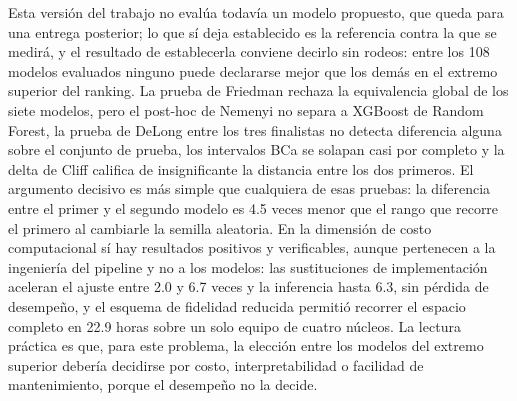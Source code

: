 \documentclass[pdflatex,sn-mathphys-num]{sn-jnl}
\begin{document}
Esta versión del trabajo no evalúa todavía un modelo propuesto, que queda para una entrega posterior; lo que sí deja establecido es la referencia contra la que se medirá, y el resultado de establecerla conviene decirlo sin rodeos: entre los 108 modelos evaluados ninguno puede declararse mejor que los demás en el extremo superior del ranking. La prueba de Friedman rechaza la equivalencia global de los siete modelos, pero el post-hoc de Nemenyi no separa a XGBoost de Random Forest, la prueba de DeLong entre los tres finalistas no detecta diferencia alguna sobre el conjunto de prueba, los intervalos BCa se solapan casi por completo y la delta de Cliff califica de insignificante la distancia entre los dos primeros. El argumento decisivo es más simple que cualquiera de esas pruebas: la diferencia entre el primer y el segundo modelo es 4.5 veces menor que el rango que recorre el primero al cambiarle la semilla aleatoria. En la dimensión de costo computacional sí hay resultados positivos y verificables, aunque pertenecen a la ingeniería del pipeline y no a los modelos: las sustituciones de implementación aceleran el ajuste entre 2.0 y 6.7 veces y la inferencia hasta 6.3, sin pérdida de desempeño, y el esquema de fidelidad reducida permitió recorrer el espacio completo en 22.9 horas sobre un solo equipo de cuatro núcleos. La lectura práctica es que, para este problema, la elección entre los modelos del extremo superior debería decidirse por costo, interpretabilidad o facilidad de mantenimiento, porque el desempeño no la decide.
\end{document}

